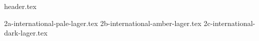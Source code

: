 \clearpage
{}
\divisorLine

{header.tex}

\begin{multicols}{2}

{2a-international-pale-lager.tex}
{2b-international-amber-lager.tex}
{2c-international-dark-lager.tex}

\end{multicols}